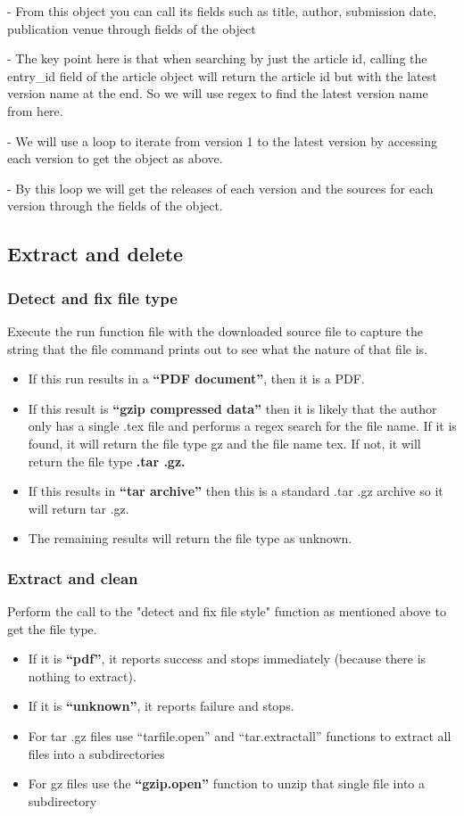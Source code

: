 \documentclass[12pt]{article}
\begin{document}
- From this object you can call its fields such as title, author, submission date, publication venue through fields of the object

- The key point here is that when searching by just the article id, calling the entry\_id field of the article object will return the article id but with the latest version name at the end. So we will use regex to find the latest version name from here.

- We will use a loop to iterate from version 1 to the latest version by accessing each version to get the object as above.

- By this loop we will get the releases of each version and the sources for each version through the fields of the object.

\subsection{Extract and delete}
\subsubsection{Detect and fix file type}
Execute the run function file with the downloaded source file to capture the string that the file command prints out to see what the nature of that file is.
\begin{itemize}
    \item If this run results in a \textbf{\enquote{PDF document}}, then it is a PDF.
    \item If this result is \textbf{\enquote{gzip compressed data}} then it is likely that the author only has a single .tex file and performs a regex search for the file name. If it is found, it will return the file type gz and the file name tex. If not, it will return the file type \textbf{.tar .gz.}
    \item If this results in \textbf{\enquote{tar archive}} then this is a standard .tar .gz archive so it will return tar .gz.
    \item The remaining results will return the file type as unknown.
\end{itemize}
\subsubsection{Extract and clean}
Perform the call to the "detect and fix file style" function as mentioned above to get the file type.
\begin{itemize}
    \item If it is \textbf{\enquote{pdf}}, it reports success and stops immediately (because there is nothing to extract).
    \item If it is \textbf{\enquote{unknown}}, it reports failure and stops.
    \item For tar .gz files use \enquote{tarfile.open} and \enquote{tar.extractall} functions to extract all files into a subdirectories 
    \item For gz files use the \textbf{\enquote{gzip.open}} function to unzip that single file into a subdirectory
\end{itemize}
\end{document}
